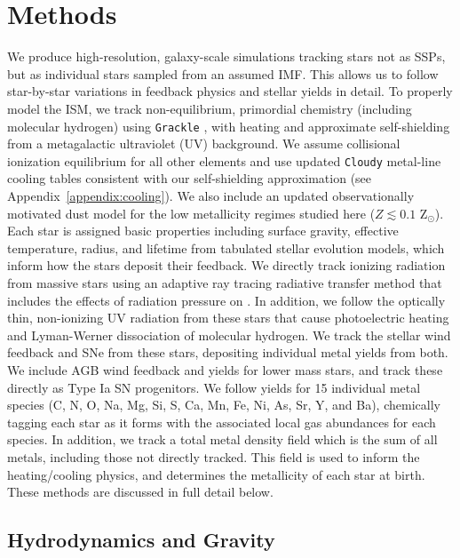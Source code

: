 \documentclass[twocolumn]{aastex61}
\begin{document}
\section{Methods}
\label{sec:methods}
We produce high-resolution, galaxy-scale simulations tracking stars not as SSPs, but as individual stars sampled from an assumed IMF.
This allows us to follow star-by-star variations in feedback physics and stellar yields in detail. To properly model the ISM, we track non-equilibrium, primordial chemistry (including molecular hydrogen) using \texttt{Grackle} \citep{GrackleMethod}, with heating and approximate self-shielding from a metagalactic ultraviolet (UV) background. We assume collisional ionization equilibrium for all other elements and use updated \texttt{Cloudy} metal-line cooling tables consistent with our self-shielding approximation (see Appendix~\ref{appendix:cooling}). We also include an updated observationally motivated dust model for the low metallicity regimes studied here ($Z \lesssim 0.1$ Z$_{\odot}$). Each star is assigned basic properties including surface gravity, effective temperature, radius, and lifetime from tabulated stellar evolution models, which inform how the stars deposit their feedback. We directly track ionizing radiation from massive stars using an adaptive ray tracing radiative transfer method that includes the effects of radiation pressure on . In addition, we follow the optically thin, non-ionizing UV radiation from these stars that cause photoelectric heating and Lyman-Werner dissociation of molecular hydrogen. We track the stellar wind feedback and SNe from these stars, depositing individual metal yields from both. We include AGB wind feedback and yields for lower mass stars, and track these directly as Type Ia SN progenitors. We follow yields for 15 individual metal species (C, N, O, Na, Mg, Si, S, Ca, Mn, Fe, Ni, As, Sr, Y, and Ba), chemically tagging each star as it forms with the associated local gas abundances for each species. In addition, we track a total metal density field which is the sum of all metals, including those not directly tracked. This field is used to inform the heating/cooling physics, and determines the metallicity of each star at birth. These methods are discussed in full detail below.

\subsection{Hydrodynamics and Gravity}
\label{sec:hydro}
\end{document}
